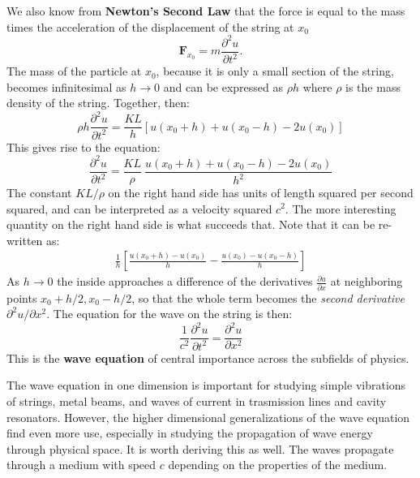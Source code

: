 	We also know from \textbf{Newton's Second Law} that the force is equal to the mass times the acceleration of the displacement of the string at $x_0$
	\begin{equation}
		\mathbf F_{x_0} = m \frac{\partial^2 u}{\partial t^2}.
	\end{equation}
	The mass of the particle at $x_0$, because it is only a small section of the string, becomes infinitesimal as $h \rightarrow 0$ and can be expressed as $\rho h$ where $\rho$ is the mass density of the string. Together, then:
	\begin{equation}
		\rho h \frac{\partial^2 u}{\partial t^2} = \frac{KL}{h} [u(x_0 + h) + u(x_0 - h) - 2 u(x_0)]
	\end{equation}
	This gives rise to the equation:
	\begin{equation}
		\frac{\partial^2 u}{\partial t^2} = \frac{KL}{\rho} ~ \frac{u(x_0 + h) + u(x_0 - h) - 2 u(x_0)}{h^2}
	\end{equation}
	The constant $KL/\rho$ on the right hand side has units of length squared per second squared, and can be interpreted as a velocity squared $c^2$. The more interesting quantity on the right hand side is what succeeds that. Note that it can be re-written as:
	\begin{align*}
		\frac{1}{h} \left[\frac{u(x_0 + h) - u(x_0)}{h}  - \frac{u(x_0) - u(x_0 - h)}{h}\right]
	\end{align*}
	As $h \rightarrow 0$ the inside approaches a difference of the derivatives $\frac{\partial u}{\partial x}$ at neighboring points $x_0 + h/2, x_0 - h/2$, so that the whole term becomes the \emph{second derivative} $\partial^2 u/\partial x^2$. The equation for the wave on the string is then:
	\begin{equation}
		\frac{1}{c^2} \frac{\partial^2 u}{\partial t^2} = \frac{\partial^2 u}{\partial x^2}
	\end{equation}
	This is the \textbf{wave equation} of central importance across the subfields of physics. 
	
	The wave equation in one dimension is important for studying simple vibrations of strings, metal beams, and waves of current in trasmission lines and cavity resonators. However, the higher dimensional generalizations of the wave equation find even more use, especially in studying the propagation of wave energy through physical space. It is worth deriving this as well. The waves propagate through a medium with speed $c$ depending on the properties of the medium. 
	
